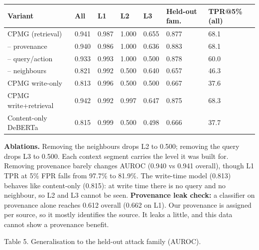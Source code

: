 \documentclass[
]{article}
\begin{document}
\begin{longtable}[]{@{}lllllll@{}}
\toprule\noalign{}
Variant & All & L1 & L2 & L3 & Held-out fam. & TPR@5\% (all) \\
\midrule\noalign{}
\endhead
\bottomrule\noalign{}
\endlastfoot
CPMG (retrieval) & 0.941 & 0.987 & 1.000 & 0.655 & 0.877 & 68.1 \\
-- provenance & 0.940 & 0.986 & 1.000 & 0.636 & 0.883 & 68.1 \\
-- query/action & 0.933 & 0.993 & 1.000 & 0.500 & 0.878 & 60.0 \\
-- neighbours & 0.821 & 0.992 & 0.500 & 0.640 & 0.657 & 46.3 \\
CPMG write-only & 0.813 & 0.996 & 0.500 & 0.500 & 0.667 & 37.6 \\
CPMG write+retrieval & 0.942 & 0.992 & 0.997 & 0.647 & 0.875 & 68.3 \\
Content-only DeBERTa & 0.815 & 0.999 & 0.500 & 0.498 & 0.666 & 37.7 \\
\end{longtable}

\textbf{Ablations.} Removing the neighbours drops L2 to 0.500; removing
the query drops L3 to 0.500. Each context segment carries the level it
was built for. Removing provenance barely changes AUROC (0.940 vs 0.941
overall), though L1 TPR at 5\% FPR falls from 97.7\% to 81.9\%. The
write-time model (0.813) behaves like content-only (0.815): at write
time there is no query and no neighbour, so L2 and L3 cannot be seen.
\textbf{Provenance leak check:} a classifier on provenance alone reaches
0.612 overall (0.662 on L1). Our provenance is assigned per source, so
it mostly identifies the source. It leaks a little, and this data cannot
show a provenance benefit.

Table 5. Generalisation to the held-out attack family (AUROC).
\end{document}
